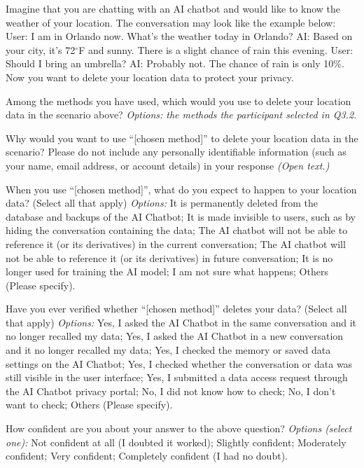 {
\begin{description}[leftmargin=0pt,itemsep=1pt,font=\normalfont]
\item[\textbf{Q4.1}] Imagine that you are chatting with an AI chatbot and would like to know the weather of your location. The conversation may look like the example below: User: I am in Orlando now. What's the weather today in Orlando? AI: Based on your city, it's 72$^\circ$F and sunny. There is a slight chance of rain this evening. User: Should I bring an umbrella? AI: Probably not. The chance of rain is only 10\%. Now you want to delete your location data to protect your privacy.
\item[\textbf{Q4.2}] Among the methods you have used, which would you use to delete your location data in the scenario above? \emph{Options: the methods the participant selected in Q3.2.}
\item[\textbf{Q4.3}] Why would you want to use ``[chosen method]'' to delete your location data in the scenario? Please do not include any personally identifiable information (such as your name, email address, or account details) in your response \emph{(Open text.)}
\item[\textbf{Q4.4}] When you use ``[chosen method]'', what do you expect to happen to your location data? (Select all that apply) \emph{Options:} It is permanently deleted from the database and backups of the AI Chatbot; It is made invisible to users, such as by hiding the conversation containing the data; The AI chatbot will not be able to reference it (or its derivatives) in the current conversation; The AI chatbot will not be able to reference it (or its derivatives) in future conversation; It is no longer used for training the AI model; I am not sure what happens; Others (Please specify).
\item[\textbf{Q4.5}] Have you ever verified whether ``[chosen method]'' deletes your data? (Select all that apply) \emph{Options:} Yes, I asked the AI Chatbot in the same conversation and it no longer recalled my data; Yes, I asked the AI Chatbot in a new conversation and it no longer recalled my data; Yes, I checked the memory or saved data settings on the AI Chatbot; Yes, I checked whether the conversation or data was still visible in the user interface; Yes, I submitted a data access request through the AI Chatbot privacy portal; No, I did not know how to check; No, I don't want to check; Others (Please specify).
\item[\textbf{Q4.6}] How confident are you about your answer to the above question? \emph{Options (select one):} Not confident at all (I doubted it worked); Slightly confident; Moderately confident; Very confident; Completely confident (I had no doubt).

\end{description}}
